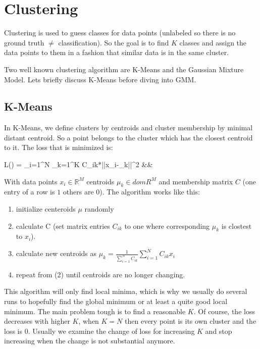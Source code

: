 \documentclass[12pt]{article}
\newcommand{\eqnsnn}[1]{\begin{flalign*} #1 \end{flalign*}}
\newcommand{\dom}[1]{\mathbb{#1}}
\begin{document}
\section{Clustering}
Clustering is used to guess classes for data points (unlabeled so there is no ground truth $\neq$ classification).
So the goal is to find $K$ classes and assign the data points to them in a fashion that similar data is in the same cluster.

Two well known clustering algorithm are K-Means and the Gaussian Mixture Model.
Lets briefly discuss K-Means before diving into GMM.

\subsection{K-Means}
In K-Means, we define clusters by centroids and cluster membership by minimal distant centroid.
So a point belongs to the cluster which has the closest centroid to it.
The loss that is minimized is:
\eqnsnn{
L(\mu) = \sum_{i=1}^N \sum_{k=1}^K C_{ik}*||x_i-\mu_k||^2
&&}
With data points $x_i \in \dom{R}^M$ centroids $\mu_k \in dom{R}^M$ and membership matrix $C$ (one entry of a row is $1$ others are $0$).
The algorithm works like this:
\begin{enumerate}
\item initialize centeroids $\mu$ randomly
\item calculate C (set matrix entries $C_{ik}$ to one where corresponding $\mu_k$ is clostest to $x_i$).
\item calculate new centroids as $\mu_k = \frac1{\sum_{i=1}^N C_{ik}} \sum_{i=1}^N C_{ik} x_i$
\item repeat from (2) until centroids are no longer changing.
\end{enumerate}

This algorithm will only find local minima, which is why we usually do several runs to hopefully find the global minimum or at least a quite good local minimum.
The main problem tough is to find a reasonable $K$.
Of course, the loss decreases with higher $K$, when $K=N$ then every point is its own cluster and the loss is $0$.
Usually we examine the change of loss for increasing $K$ and stop increasing when the change is not substantial anymore.
\end{document}
